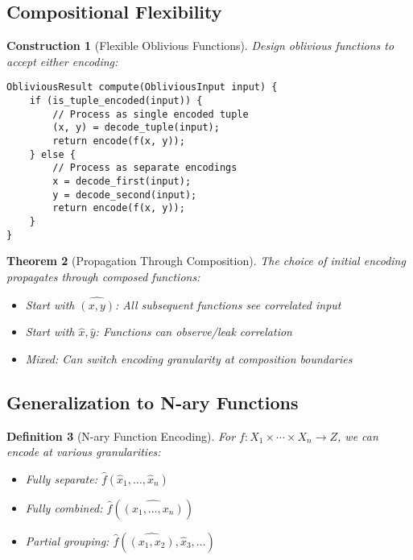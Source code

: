 \documentclass[11pt,final,hidelinks]{article}
\newtheorem{theorem}{Theorem}[section]
\newtheorem{definition}[theorem]{Definition}
\newtheorem{construction}[theorem]{Construction}
\begin{document}
\subsection{Compositional Flexibility}

\begin{construction}[Flexible Oblivious Functions]
Design oblivious functions to accept either encoding:
\begin{verbatim}
ObliviousResult compute(ObliviousInput input) {
    if (is_tuple_encoded(input)) {
        // Process as single encoded tuple
        (x, y) = decode_tuple(input);
        return encode(f(x, y));
    } else {
        // Process as separate encodings
        x = decode_first(input);
        y = decode_second(input);
        return encode(f(x, y));
    }
}
\end{verbatim}
\end{construction}

\begin{theorem}[Propagation Through Composition]
The choice of initial encoding propagates through composed functions:
\begin{itemize}
    \item Start with $\widehat{(x,y)}$: All subsequent functions see correlated input
    \item Start with $\hat{x}, \hat{y}$: Functions can observe/leak correlation
    \item Mixed: Can switch encoding granularity at composition boundaries
\end{itemize}
\end{theorem}

\subsection{Generalization to N-ary Functions}

\begin{definition}[N-ary Function Encoding]
For $f: X_1 \times \cdots \times X_n \to Z$, we can encode at various granularities:
\begin{itemize}
    \item Fully separate: $\hat{f}(\hat{x}_1, \ldots, \hat{x}_n)$
    \item Fully combined: $\hat{f}(\widehat{(x_1, \ldots, x_n)})$
    \item Partial grouping: $\hat{f}(\widehat{(x_1, x_2)}, \hat{x}_3, \ldots)$
\end{itemize}
\end{definition}
\end{document}
